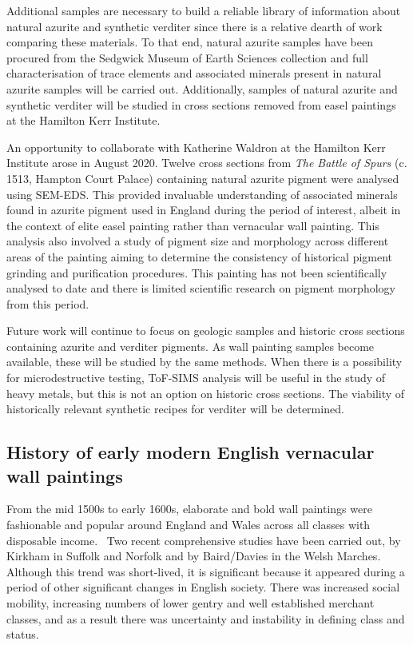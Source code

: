 Additional samples are necessary to build a reliable library of information about natural azurite and synthetic verditer since there is a relative dearth of work comparing these materials. To that end, natural azurite samples have been procured from the Sedgwick Museum of Earth Sciences collection and full characterisation of trace elements and associated minerals present in natural azurite samples will be carried out. Additionally, samples of natural azurite and synthetic verditer will be studied in cross sections removed from easel paintings at the Hamilton Kerr Institute.

An opportunity to collaborate with Katherine Waldron at the Hamilton Kerr Institute arose in August 2020. Twelve cross sections from \textit{The Battle of Spurs} (c. 1513, Hampton Court Palace) containing natural azurite pigment were analysed using SEM-EDS. This provided invaluable understanding of associated minerals found in azurite pigment used in England during the period of interest, albeit in the context of elite easel painting rather than vernacular wall painting. This analysis also involved a study of pigment size and morphology across different areas of the painting aiming to determine the consistency of historical pigment grinding and purification procedures. This painting has not been scientifically analysed to date and there is limited scientific research on pigment morphology from this period.

Future work will continue to focus on geologic samples and historic cross sections containing azurite and verditer pigments. As wall painting samples become available, these will be studied by the same methods. When there is a possibility for microdestructive testing, ToF-SIMS analysis will be useful in the study of heavy metals, but this is not an option on historic cross sections. The viability of historically relevant synthetic recipes for verditer will be determined.

\subsection[History of early modern English wall paintings]{History of early modern English vernacular wall paintings}
\label{subsection1.1.2}

From the mid 1500s to early 1600s, elaborate and bold wall paintings were fashionable and popular around England and Wales across all classes with disposable income.~\autocite{Baird_thesis,Davies_book,Kirkham_thesis} Two recent comprehensive studies have been carried out, by Kirkham in Suffolk and Norfolk and by Baird/Davies in the Welsh Marches. Although this trend was short-lived, it is significant because it appeared during a period of other significant changes in English society. There was increased social mobility, increasing numbers of lower gentry and well established merchant classes, and as a result there was uncertainty and instability in defining class and status.~\autocite{Baird_thesis} 

